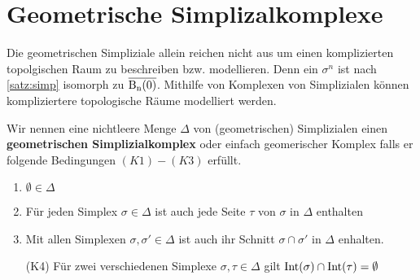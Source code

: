 
\section{Geometrische Simplizalkomplexe}

Die geometrischen Simpliziale allein reichen nicht aus um einen
komplizierten topolgischen Raum zu beschreiben bzw. modellieren. Denn
ein $\sigma^n$ ist nach \cref{satz:simp} isomorph zu $\operatorname{\overline{\operatorname{B}_{n}(0)}}$.
Mithilfe von Komplexen von Simplizialen können kompliziertere topologische Räume modelliert werden.

\begin{Def}
  Wir nennen eine nichtleere Menge $\Delta$ von (geometrischen) Simplizialen
  einen \textbf{geometrischen Simplizialkomplex} oder einfach
  geomerischer Komplex falls er folgende Bedingungen $(K1) - (K3)$
  erfüllt.
  \begin{enumerate}[(K1)]
  \item $\emptyset \in \Delta$
  \item Für jeden Simplex $\sigma \in \Delta$ ist auch jede Seite
    $\tau$ von $\sigma$ in $\Delta$ enthalten
  \item Mit allen Simplexen $\sigma, \sigma' \in \Delta$ ist auch ihr
    Schnitt $\sigma \cap \sigma'$ in $\Delta$ enhalten.
  \item[(K4)] Für zwei verschiedenen Simplexe $\sigma,\tau \in \Delta$
    gilt $\operatorname{Int}(\sigma) \cap \operatorname{Int}(\tau) = \emptyset$
  \end{enumerate}
\end{Def}


